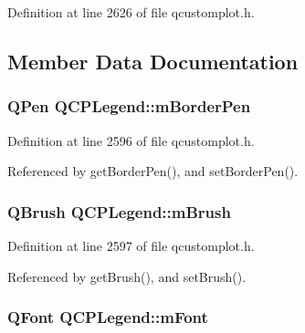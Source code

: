 Definition at line 2626 of file qcustomplot.\+h.



\subsection{Member Data Documentation}
\hypertarget{class_q_c_p_legend_a52ab8342a382456131d567f962d7f9d0}{}
\subsubsection[{m\+Border\+Pen}]{\setlength{\rightskip}{0pt plus 5cm}Q\+Pen Q\+C\+P\+Legend\+::m\+Border\+Pen\hspace{0.3cm}{\ttfamily [protected]}}\label{class_q_c_p_legend_a52ab8342a382456131d567f962d7f9d0}


Definition at line 2596 of file qcustomplot.\+h.



Referenced by get\+Border\+Pen(), and set\+Border\+Pen().

\hypertarget{class_q_c_p_legend_a9bd7cd05a9a485e06eda513a348baf80}{}
\subsubsection[{m\+Brush}]{\setlength{\rightskip}{0pt plus 5cm}Q\+Brush Q\+C\+P\+Legend\+::m\+Brush\hspace{0.3cm}{\ttfamily [protected]}}\label{class_q_c_p_legend_a9bd7cd05a9a485e06eda513a348baf80}


Definition at line 2597 of file qcustomplot.\+h.



Referenced by get\+Brush(), and set\+Brush().

\hypertarget{class_q_c_p_legend_a56ffacb184a99eefe09a0c7181d0713d}{}
\subsubsection[{m\+Font}]{\setlength{\rightskip}{0pt plus 5cm}Q\+Font Q\+C\+P\+Legend\+::m\+Font\hspace{0.3cm}{\ttfamily [protected]}}\label{class_q_c_p_legend_a56ffacb184a99eefe09a0c7181d0713d}


